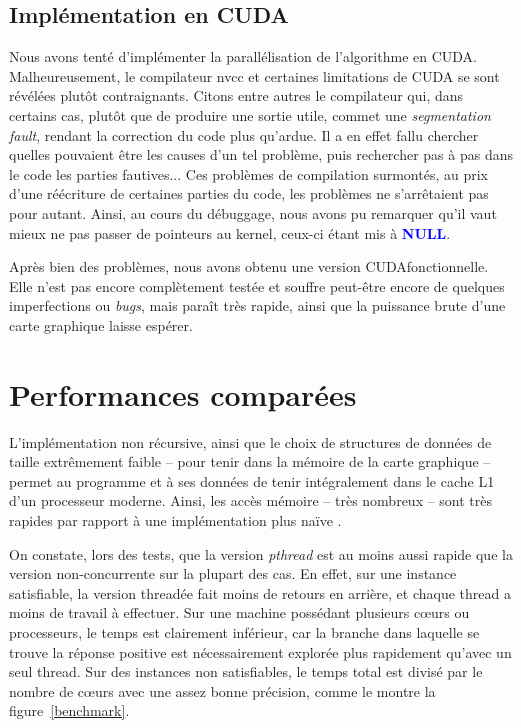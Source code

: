 \documentclass{article}
\newcommand{\keyword}[1]{\textbf{\textcolor{blue}{#1}}}
\newcommand{\cuda}{\textsc{CUDA}}
\begin{document}
\subsection{Implémentation en \cuda}
    Nous avons tenté d'implémenter la parallélisation de l'algorithme en \cuda. Malheureusement, le compilateur nvcc et certaines limitations de CUDA se sont révélées plutôt contraignants. Citons entre autres le compilateur qui, dans certains cas, plutôt que de produire une sortie utile, commet une \emph{segmentation fault}, rendant la correction du code plus qu'ardue. Il a en effet fallu chercher quelles pouvaient être les causes d'un tel problème, puis rechercher pas à pas dans le code les parties fautives... Ces problèmes de compilation surmontés, au prix d'une réécriture de certaines parties du code, les problèmes ne s'arrêtaient pas pour autant. Ainsi, au cours du débuggage, nous avons pu remarquer qu'il vaut mieux ne pas passer de pointeurs au kernel, ceux-ci étant mis à \keyword{NULL}.

Après bien des problèmes, nous avons obtenu une version \cuda fonctionnelle. Elle n'est pas encore complètement testée et souffre peut-être encore de quelques imperfections ou \emph{bugs}, mais paraît très rapide, ainsi que la puissance brute d'une carte graphique laisse espérer. 



\section{Performances comparées}
    L'implémentation non récursive, ainsi que le choix de structures de données de taille extrêmement faible -- pour tenir dans la mémoire de la carte graphique -- permet au programme et à ses données de tenir intégralement dans le cache L1 d'un processeur moderne. Ainsi, les accès mémoire -- très nombreux -- sont très rapides par rapport à une implémentation plus \og naïve \fg.

    On constate, lors des tests, que la version \emph{pthread} est au moins aussi rapide que la version non-concurrente sur la plupart des cas. En effet, sur une instance satisfiable, la version threadée fait moins de retours en arrière, et chaque thread a moins de travail à effectuer. Sur une machine possédant plusieurs cœurs ou processeurs, le temps est clairement inférieur, car la branche dans laquelle se trouve la réponse positive est nécessairement explorée plus rapidement qu'avec un seul thread. Sur des instances non satisfiables, le temps total est divisé par le nombre de cœurs avec une assez bonne précision, comme le montre la figure~\ref{benchmark}.
\end{document}
